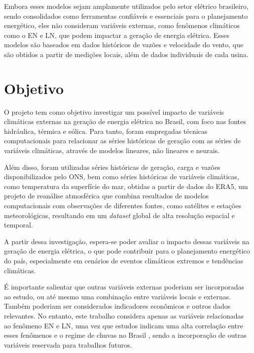 Embora esses modelos sejam amplamente utilizados pelo setor elétrico brasileiro, sendo consolidados como ferramentas
confiáveis e essenciais para o planejamento energético, eles não consideram variáveis externas, como fenômenos climáticos
como o EN e LN, que podem impactar a geração de energia elétrica. Esses modelos são baseados em dados históricos de
vazões e velocidade do vento, que são obtidos a partir de medições locais, além de dados individuais de cada usina.

\section{Objetivo}
O projeto tem como objetivo investigar um possível impacto de variáveis climáticas externas na geração 
de energia elétrica no Brasil, com foco nas fontes hidráulica, térmica e eólica. Para tanto, foram empregadas técnicas 
computacionais para relacionar as séries históricas de geração com as séries de variáveis 
climáticas, através de modelos lineares, não lineares e neurais. 

Além disso, foram utilizadas séries históricas de geração, 
carga e vazões disponibilizados pelo ONS, bem como séries históricas de variáveis climáticas, como temperatura 
da superfície do mar, obtidas a partir de dados do ERA5, um projeto de reanálise atmosférica que combina resultados de
modelos computacionais com observações de diferentes fontes, como satélites e estações meteorológicas, resultando em
um \textit{dataset} global de alta resolução espacial e temporal. 

A partir dessa investigação, espera-se poder avaliar o impacto dessas variáveis na geração de energia elétrica,
o que pode contribuir para o planejamento energético do país, especialmente em cenários de eventos climáticos extremos e
tendências climáticas.

É importante salientar que outras variáveis externas poderiam ser incorporadas ao estudo, ou até mesmo uma combinação entre
 variáveis locais e externas. Também poderiam ser considerados indicadores econômicos e outros dados relevantes. 
No entanto, este trabalho considera apenas as variáveis relacionadas ao fenômeno EN e LN, uma vez que estudos indicam
uma alta correlação entre esses fenômenos e o regime de chuvas no Brasil \cite{de2012influencia, Andreoli2016}, sendo a 
incorporação de outras variáveis reservada para trabalhos futuros.


